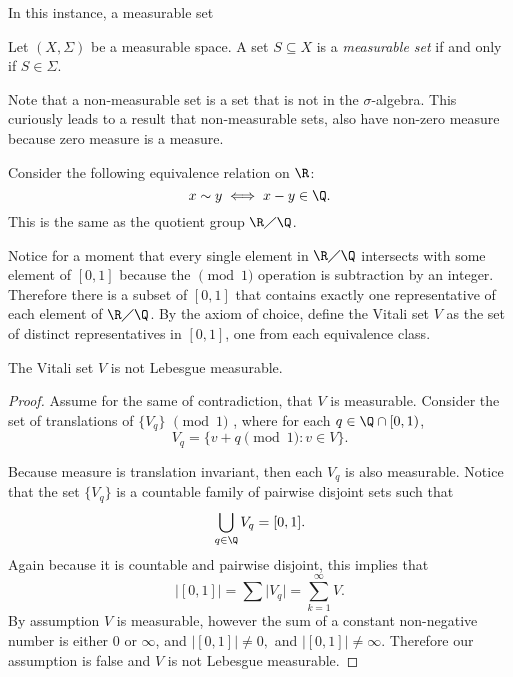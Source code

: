 In this instance, a measurable set 
\begin{definition}
    Let $(X,\Sigma)$ be a measurable space.  A set $S\subseteq X$ is a \textit{measurable set} if and only if $S \in \Sigma$.
\end{definition}
Note that a non-measurable set is a set that is not in the $\sigma$-algebra.  This curiously leads to a result that non-measurable sets, also have non-zero measure because zero measure is a measure.  

\begin{example}
    Consider the following equivalence relation on $\R$: 
    $$ x\sim y \iff x-y \in \Q.$$  This is the same as the quotient group $\R \diagup \Q$.  

    Notice for a moment that every single element in $\R \diagup \Q$  intersects with some element of $[0,1]$ because the $\pmod{1}$ operation is subtraction by an integer.  Therefore there is a subset of $[0,1]$ that contains exactly one representative of each element of $\R \diagup \Q$.
    By the axiom of choice, define the Vitali set $V$ as the set of distinct representatives in $[0,1]$, one from each equivalence class. 
    \begin{claim}The Vitali set $V$ is not Lebesgue measurable.
    \end{claim}
    \begin{proof}
        
    
    Assume for the same of contradiction, that $V$ is measurable.
    Consider the set of translations of $\{V_q\}$ $\pmod{1}$ , where for each $q \in \Q\cap[0,1)$, $$V_q = \{v+ q \pmod{1}: v \in V\}.$$   

    Because measure is translation invariant, then each $V_q$ is also measurable.  Notice that the set $\{V_q\}$ is a countable family of pairwise disjoint sets such that 
    $$\bigcup_{q \in \Q} V_q = [0,1].$$ 
    Again because it is countable and pairwise disjoint, this implies that 
    \begin{equation}\label{eqn:vitineq}
        \big\vert [0,1] \big\vert = \sum \vert V_q\vert = \sum_{k = 1}^\infty V.
    \end{equation}
    By assumption $V$ is measurable, however the sum of a constant non-negative number is either $0$ or $\infty$, and $\vert [0,1]\vert \neq 0,$ and $\vert [0,1]\vert \neq \infty$.  Therefore our assumption is false and $V$ is not Lebesgue measurable.  
    \end{proof}
  
\end{example}

